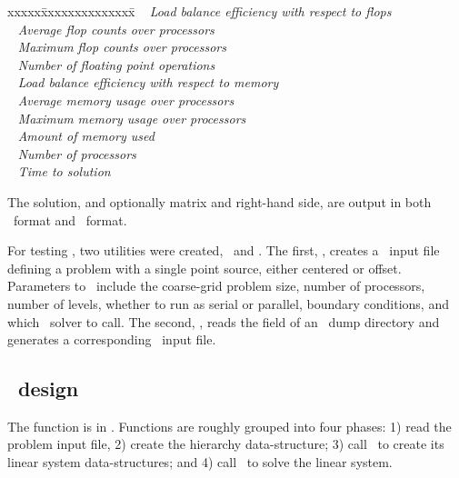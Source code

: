 \documentclass[10pt]{article}
\begin{document}
\begin{tabbing}
xxxxx\=xxxxxxxxxxxxxx\=\kill
\> \todo\  \>    \textit{Load balance efficiency with respect to flops}\\
\> \todo\  \> \textit{Average flop counts over processors} \\
\> \todo\  \> \textit{Maximum flop counts over processors} \\
\> \todo\  \> \textit{Number of floating point operations} \\
\> \todo\  \>    \textit{Load balance efficiency with respect to memory}\\
\> \todo\  \> \textit{Average memory usage over processors} \\
\> \todo\  \>    \textit{Maximum memory usage over processors} \\
\> \todo\  \> \textit{Amount of memory used} \\
\> \todo\  \> \textit{Number of processors} \\
\> \todo\  \>  \textit{Time to solution}
\end{tabbing}

The solution, and optionally matrix and right-hand side, are output in both
\hypresolve\ format and \hypre\ format.


For testing \hypresolve, two utilities were created, \hypreinit\ and
\enzotohypre.  The first, \hypreinit, creates a \hypresolve\ input file defining
a problem with a single point source, either centered or offset.
Parameters to \hypreinit\ include the coarse-grid problem size, number
of processors, number of levels, whether to run as serial or parallel,
boundary conditions, and which \hypre\ solver to call.  The second,
\enzotohypre, reads the  field of an \enzo\ dump
directory and generates a corresponding \hypresolve\ input file.

\subsection{\hypresolve\ design} \label{sss:design}

The  function is in .  Functions
are roughly grouped into four phases: 1) read the problem input file,
2) create the hierarchy data-structure; 3) call \hypre\ to create its
linear system data-structures; and 4) call \hypre\ to solve the linear
system.
\end{document}

